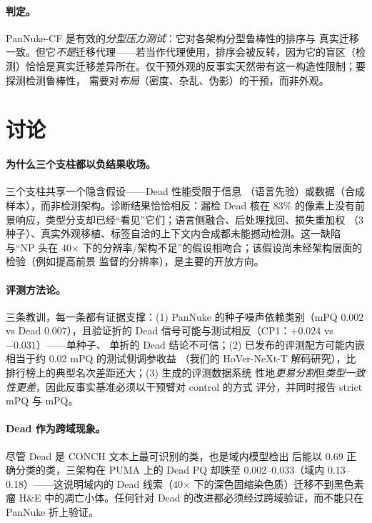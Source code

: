 \documentclass[11pt]{article}
\begin{document}
\paragraph{判定。}PanNuke-CF 是有效的\emph{分型压力测试}：它对各架构分型鲁棒性的排序与
真实迁移一致。但它\emph{不是}迁移代理——若当作代理使用，排序会被反转，因为它的盲区（检
测）恰恰是真实迁移差异所在。仅干预外观的反事实天然带有这一构造性限制；要探测检测鲁棒性，
需要对\emph{布局}（密度、杂乱、伪影）的干预，而非外观。

\section{讨论}
\label{sec:discussion}

\paragraph{为什么三个支柱都以负结果收场。}三个支柱共享一个隐含假设——Dead 性能受限于信息
（语言先验）或数据（合成样本），而非检测架构。诊断结果恰恰相反：漏检 Dead 核在 83\%
的像素上没有前景响应，类型分支却已经“看见”它们；语言侧融合、后处理找回、损失重加权
（3 种子）、真实外观移植、标签自洽的上下文内合成都未能撼动检测。这一缺陷与“NP 头在
40$\times$ 下的分辨率/架构不足”的假设相吻合；该假设尚未经架构层面的检验（例如提高前景
监督的分辨率），是主要的开放方向。

\paragraph{评测方法论。}三条教训，每一条都有证据支撑：(1) PanNuke 的种子噪声依赖类别（mPQ 0.002 vs
Dead 0.007），且验证折的 Dead 信号可能与测试相反（CP1：$+0.024$ vs $-0.031$）——单种子、
单折的 Dead 结论不可信；(2) 已发布的评测配方可能内嵌相当于约 0.02 mPQ 的测试侧调参收益
（我们的 HoVer-NeXt-T 解码研究），比排行榜上的典型名次差距还大；(3) 生成的评测数据系统
性地\emph{更易分割}但\emph{类型一致性更差}，因此反事实基准必须以干预臂对 control 的方式
评分，并同时报告 strict mPQ 与 mPQ。

\paragraph{Dead 作为跨域现象。}尽管 Dead 是 CONCH 文本上最可识别的类，也是域内模型检出
后能以 0.69 正确分类的类，三架构在 PUMA 上的 Dead PQ 却跌至 0.002--0.033（域内
0.13--0.18）——这说明域内的
Dead 线索（40$\times$ 下的深色固缩染色质）迁移不到黑色素瘤 H\&E 中的凋亡小体。任何针对
Dead 的改进都必须经过跨域验证，而不能只在 PanNuke 折上验证。
\end{document}
